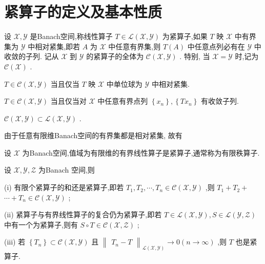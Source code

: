 \documentclass[lang=cn,newtx,10pt,scheme=chinese,thmcnt=chapter]{elegantbook}
\begin{document}
\section{紧算子的定义及基本性质}
\begin{definition}
    设 \(\mathcal{X},\mathcal{Y}\) 是Banach空间,称线性算子 \(T \in  \mathcal{L}\left( {\mathcal{X},\mathcal{Y}}\right)\) 为紧算子,如果 \(T\) 映 \(\mathcal{X}\) 中有界集为 \(\mathcal{Y}\) 中相对紧集,即若 \(A\) 为 \(\mathcal{X}\) 中任意有界集,则 \(T\left( A\right)\) 中任意点列必有在 \(\mathcal{Y}\) 中收敛的子列. 记从 \(\mathcal{X}\) 到 \(\mathcal{Y}\) 的紧算子的全体为 \(\mathcal{C}\left( {\mathcal{X},\mathcal{Y}}\right)\) . 特别, 当 \(\mathcal{X} = \mathcal{Y}\) 时,记为 \(\mathcal{C}\left( \mathcal{X}\right)\) .
\end{definition}
\begin{note}
    \(T \in  \mathcal{C}\left( {\mathcal{X},\mathcal{Y}}\right)\) 当且仅当 \(T\) 映 \(\mathcal{X}\) 中单位球为 \(\mathcal{Y}\) 中相对紧集.

     \(T \in  \mathcal{C}\left( {\mathcal{X},\mathcal{Y}}\right)\) 当且仅当对 \(\mathcal{X}\) 中任意有界点列 \(\left\{  {x}_{n}\right\}  ,\left\{  {T{x}_{n}}\right\}\) 有收敛子列.

     \(\mathcal{C}\left( {\mathcal{X},\mathcal{Y}}\right)  \subset  \mathcal{L}\left( {\mathcal{X},\mathcal{Y}}\right)\) .
\end{note}
由于任意有限维Banach空间的有界集都是相对紧集, 故有
\begin{example}
     设 \(\mathcal{X}\) 为Banach空间,值域为有限维的有界线性算子是紧算子,通常称为有限秩算子.
\end{example}
\begin{theorem}
     设 \(\mathcal{X},\mathcal{Y},\mathcal{Z}\) 为Banach 空间,则

(i) 有限个紧算子的和还是紧算子,即若 \({T}_{1},{T}_{2},\cdots ,{T}_{n} \in  \mathcal{C}\left( {\mathcal{X},\mathcal{Y}}\right)\) ,则 \({T}_{1} + {T}_{2} +\)  \(\cdots  + {T}_{n} \in  \mathcal{C}\left( {\mathcal{X},\mathcal{Y}}\right)\) ;

(ii) 紧算子与有界线性算子的复合仍为紧算子,即若 \(T \in  \mathcal{L}\left( {\mathcal{X},\mathcal{Y}}\right) ,S \in  \mathcal{L}\left( {\mathcal{Y},\mathcal{Z}}\right)\) 中有一个为紧算子,则有 \(S \circ  T \in  \mathcal{C}\left( {\mathcal{X},\mathcal{Z}}\right)\) ;

(iii) 若 \(\left\{  {T}_{n}\right\}   \subset  \mathcal{C}\left( {\mathcal{X},\mathcal{Y}}\right)\) 且 \({\begin{Vmatrix}{T}_{n} - T\end{Vmatrix}}_{\mathcal{L}\left( {\mathcal{X},\mathcal{Y}}\right) } \rightarrow  0\left( {n \rightarrow  \infty }\right)\) ,则 \(T\) 也是紧算子.

\end{theorem}
\end{document}
